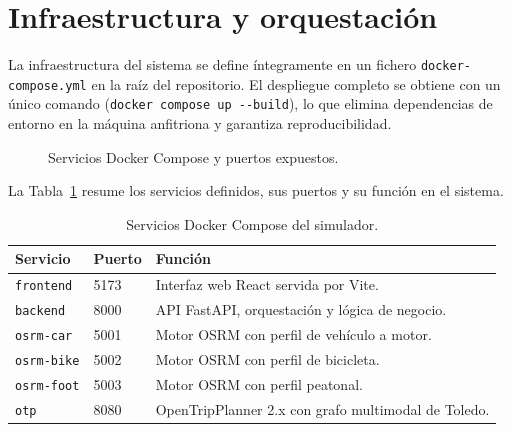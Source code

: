 \section{Infraestructura y orquestación}
\label{sec:arch_infra}

La infraestructura del sistema se define íntegramente en un fichero \texttt{docker-compose.yml} en la raíz del repositorio. El despliegue completo se obtiene con un único comando (\texttt{docker compose up -{}-build}), lo que elimina dependencias de entorno en la máquina anfitriona y garantiza reproducibilidad.

\begin{figure}[htbp]
  \centering
  \caption{Servicios Docker Compose y puertos expuestos.}
  \label{fig:arch_docker}
\end{figure}

La Tabla~\ref{tab:servicios_docker} resume los servicios definidos, sus puertos y su función en el sistema.

\begin{table}[htbp]
  \caption{Servicios Docker Compose del simulador.}
  \label{tab:servicios_docker}
  \centering
  \begin{tabular}{llp{7cm}}
    \hline
    \textbf{Servicio} & \textbf{Puerto} & \textbf{Función} \\
    \hline
    \texttt{frontend}   & 5173 & Interfaz web React servida por Vite. \\
    \texttt{backend}    & 8000 & API FastAPI, orquestación y lógica de negocio. \\
    \texttt{osrm-car}   & 5001 & Motor OSRM con perfil de vehículo a motor. \\
    \texttt{osrm-bike}  & 5002 & Motor OSRM con perfil de bicicleta. \\
    \texttt{osrm-foot}  & 5003 & Motor OSRM con perfil peatonal. \\
    \texttt{otp}        & 8080 & OpenTripPlanner 2.x con grafo multimodal de Toledo. \\
    \hline
  \end{tabular}
\end{table}

